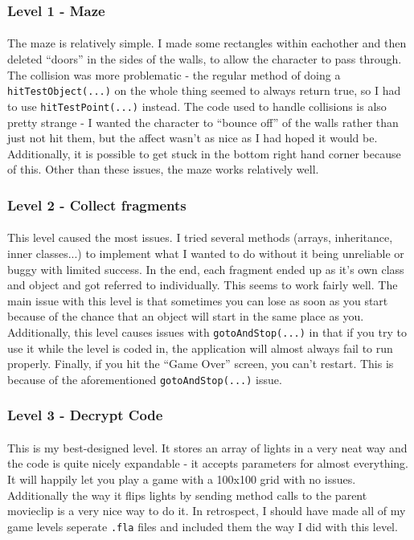 \documentclass{article}
\begin{document}
\subsubsection {Level 1 - Maze}
\paragraph{}
The maze is relatively simple. I made some rectangles within eachother and then deleted ``doors'' in the sides of the walls, to allow the character to pass through. The collision was more problematic - the regular method of doing a \texttt{hitTestObject(...)} on the whole thing seemed to always return true, so I had to use \texttt{hitTestPoint(...)} instead. The code used to handle collisions is also pretty strange - I wanted the character to ``bounce off'' of the walls rather than just not hit them, but the affect wasn't as nice as I had hoped it would be. Additionally, it is possible to get stuck in the bottom right hand corner because of this. Other than these issues, the maze works relatively well.
\subsubsection {Level 2 - Collect fragments}
\paragraph{}
This level caused the most issues. I tried several methods (arrays, inheritance, inner classes...) to implement what I wanted to do without it being unreliable or buggy with limited success. In the end, each fragment ended up as it's own class and object and got referred to individually. This seems to work fairly well. The main issue with this level is that sometimes you can lose as soon as you start because of the chance that an object will start in the same place as you. Additionally, this level causes issues with \texttt{gotoAndStop(...)} in that if you try to use it while the level is coded in, the application will almost always fail to run properly. Finally, if you hit the ``Game Over'' screen, you can't restart. This is because of the aforementioned \texttt{gotoAndStop(...)} issue.
\subsubsection {Level 3 - Decrypt Code}
\paragraph{}
This is my best-designed level. It stores an array of lights in a very neat way and the code is quite nicely expandable - it accepts parameters for almost everything. It will happily let you play a game with a 100x100 grid with no issues. Additionally the way it flips lights by sending method calls to the parent movieclip is a very nice way to do it. In retrospect, I should have made all of my game levels seperate \texttt{.fla} files and included them the way I did with this level.
\end{document}
